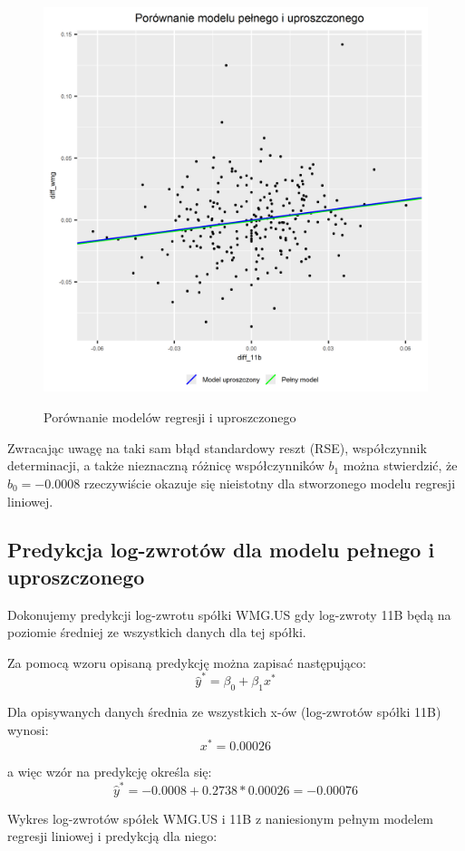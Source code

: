 \documentclass[a4paper,11pt]{article}
\begin{document}
\begin{figure}[h]
\centering
\includegraphics[width=12cm, height=12cm]{img/reg_porownanie_regresji.png}
\caption{Porównanie modelów regresji i uproszczonego}
\end{figure}

Zwracając uwagę na taki sam błąd standardowy reszt (RSE), współczynnik determinacji, a także nieznaczną różnicę współczynników \(b_1\) można stwierdzić, że \(b_0=-0.0008\) rzeczywiście okazuje się nieistotny dla stworzonego modelu regresji liniowej.

\subsection{Predykcja log-zwrotów dla modelu pełnego i uproszczonego}

Dokonujemy predykcji log-zwrotu spółki WMG.US gdy log-zwroty 11B będą na poziomie średniej ze wszystkich danych dla tej spółki. 

Za pomocą wzoru opisaną predykcję można zapisać następująco:
\[\hat{y}^* = \beta_0 + \beta_1 x^*\]

Dla opisywanych danych średnia ze wszystkich x-ów (log-zwrotów spółki 11B) wynosi:
\[x^* = 0.00026\]

a więc wzór na predykcję określa się:
\[\hat{y}^* = -0.0008 + 0.2738*0.00026 = -0.00076\]

\newpage
Wykres log-zwrotów spółek WMG.US i 11B z naniesionym pełnym modelem regresji liniowej i predykcją dla niego:
\end{document}
